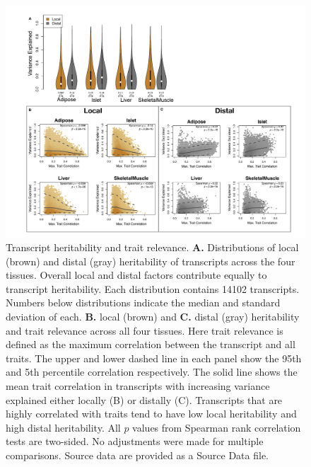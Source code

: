 \documentclass[
]{article}
\begin{document}
\begin{figure}[ht!]
\includegraphics[width=\textwidth]{Figures/Fig2_motivation.pdf} 
\caption{Transcript heritability and trait relevance. 
\textbf{A.} Distributions of local (brown) and distal (gray) 
heritability of transcripts across the four tissues. Overall 
local and distal factors contribute equally to transcript 
heritability. Each distribution contains 14102 transcripts. 
Numbers below distributions indicate the median and 
standard deviation of each. \textbf{B.} local (brown) and 
\textbf{C.} distal (gray) heritability and trait relevance across 
all four tissues. Here trait relevance is defined as the maximum 
correlation between the transcript and all traits. The upper 
and lower dashed line in each panel show the 95th and 5th 
percentile correlation respectively. The solid line shows the 
mean trait correlation in transcripts with increasing variance 
explained either locally (B) or distally (C). Transcripts that are 
highly correlated with traits tend to have low local heritability 
and high distal heritability. All $p$ values from Spearman rank
correlation tests are two-sided. No adjustments were made 
for multiple comparisons. Source data are provided as a Source 
Data file.}
\label{fig:motivation}
\end{figure}
\end{document}
